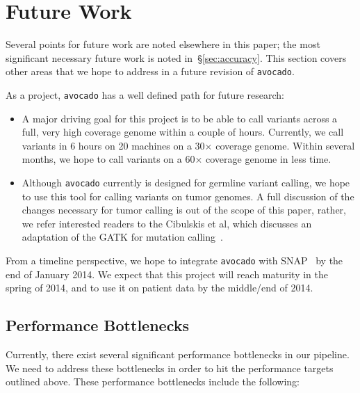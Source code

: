 \documentclass{acm_proc_article-sp}
\begin{document}
\section{Future Work}
\label{sec:future-work}


Several points for future work are noted elsewhere in this paper; the most significant necessary future work is noted
in~\S\ref{sec:accuracy}. This section covers other areas that we hope to address in a future revision of \texttt{avocado}.

As a project, \texttt{avocado} has a well defined path for future research:

\begin{itemize}
\item A major driving goal for this project is to be able to call variants across a full, very high coverage genome within a
couple of hours. Currently, we call variants in 6 hours on 20 machines on a 30$\times$ coverage genome. Within several
months, we hope to call variants on a 60$\times$ coverage genome in less time.
\item Although \texttt{avocado} currently is designed for germline variant calling, we hope to use this tool for calling
variants on tumor genomes. A full discussion of the changes necessary for tumor calling is out of the scope of this paper,
rather, we refer interested readers to the Cibulskis et al, which discusses an adaptation of the GATK for mutation calling~\cite{cibulskis13}.
\end{itemize}

From a timeline perspective, we hope to integrate \texttt{avocado} with SNAP~\cite{zaharia11} by the end of January 2014.
We expect that this project will reach maturity in the spring of 2014, and to use it on patient data by the middle/end of 2014.

\subsection{Performance Bottlenecks}
\label{sec:performance-bottlenecks}

Currently, there exist several significant performance bottlenecks in our pipeline. We need to address these bottlenecks
in order to hit the performance targets outlined above. These performance bottlenecks include the following:
\end{document}
